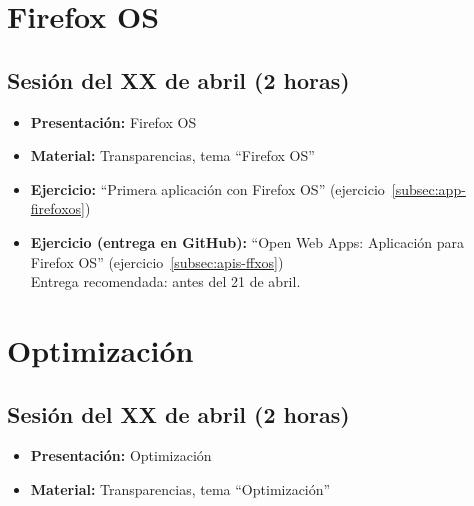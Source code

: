 \documentclass[a4paper,12pt]{report}
\begin{document}
\section{Firefox OS}

\subsection{Sesión del XX de abril (2 horas)}

\begin{itemize}
 \item \textbf{Presentación:} Firefox OS
 \item \textbf{Material:} Transparencias, tema ``Firefox OS''
 \item \textbf{Ejercicio:} ``Primera aplicación con Firefox OS'' (ejercicio~\ref{subsec:app-firefoxos})
 \item \textbf{Ejercicio (entrega en GitHub):} ``Open Web Apps: Aplicación para Firefox OS'' (ejercicio~\ref{subsec:apis-ffxos}) 
 \\
Entrega recomendada: antes del 21 de abril.
\end{itemize}


\section{Optimización}

\subsection{Sesión del XX de abril (2 horas)}

\begin{itemize}
 \item \textbf{Presentación:} Optimización
 \item \textbf{Material:} Transparencias, tema ``Optimización''
\end{itemize}
\end{document}
